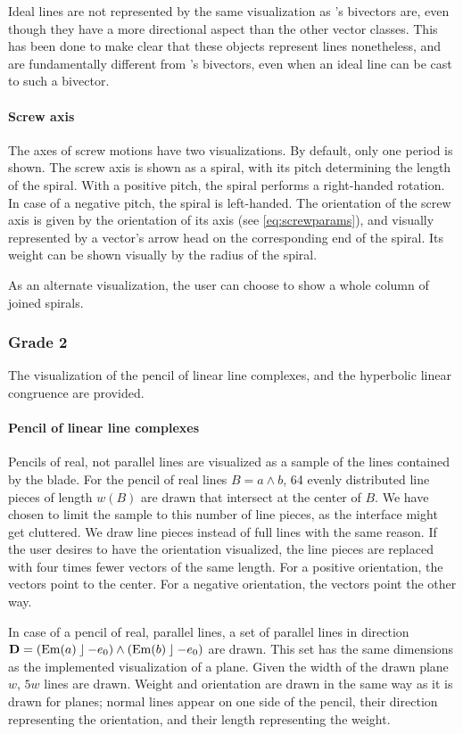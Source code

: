 Ideal lines are not represented by the same visualization as \ega's bivectors are, even though they have a more directional aspect than the other vector classes.  This has been done to make clear that these objects represent lines nonetheless, and are fundamentally different from \ega's bivectors, even when an ideal line can be cast to such a bivector.

\paragraph{Screw axis}
The axes of screw motions have two visualizations.  By default, only one period is shown.  The screw axis is shown as a spiral, with its pitch determining the length of the spiral.  With a positive pitch, the spiral performs a right-handed rotation.  In case of a negative pitch, the spiral is left-handed.  The orientation of the screw axis is given by the orientation of its axis (see \autoref{eq:screwparams}), and visually represented by a vector's arrow head on the corresponding end of the spiral.  
Its weight can be shown visually by the radius of the spiral.

As an alternate visualization, the user can choose to show a whole column of joined spirals.

\subsubsection{Grade 2}
The visualization of the pencil of linear line complexes, and the hyperbolic linear congruence are provided. 

\paragraph{Pencil of linear line complexes}
Pencils of real, not parallel lines are visualized as a sample of the lines contained by the blade.  For the pencil of real lines $B = a \wedge b$, 64 evenly distributed line pieces of length $w(B)$ are drawn that intersect at the center of $B$.  We have chosen to limit the sample to this number of line pieces, as the interface might get cluttered.  We draw line pieces instead of full lines with the same reason.  If the user desires to have the orientation visualized, the line pieces are replaced with four times fewer vectors of the same length.  For a positive orientation, the vectors point to the center.  For a negative orientation, the vectors point the other way.

In case of a pencil of real, parallel lines, a set of parallel lines in direction $\mathbf{D} = (\operatorname{Em}(a) \mathbin{\rfloor} -e_0) \wedge (\operatorname{Em}(b) \mathbin{\rfloor} -e_0)$ are drawn.  This set has the same dimensions as the implemented visualization of a plane.  Given the width of the drawn plane $w$, $5w$ lines are drawn.  Weight and orientation are drawn in the same way as it is drawn for planes; normal lines appear on one side of the pencil, their direction representing the orientation, and their length representing the weight.

